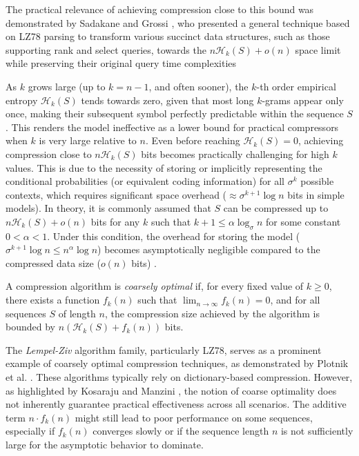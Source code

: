 The practical relevance of achieving compression close to this bound was demonstrated by Sadakane and Grossi \cite{sadakane2006squeezing}, who presented a general technique based on LZ78 parsing to transform various succinct data structures, such as those supporting rank and select queries, towards the $n \mathcal{H}_k(S) + o(n)$ space limit while preserving their original query time complexities

\begin{remark}
    As $k$ grows large (up to $k=n-1$, and often sooner), the $k$-th order empirical entropy $\mathcal{H}_k(S)$ tends towards zero, given that most long $k$-grams appear only once, making their subsequent symbol perfectly predictable within the sequence $S$. This renders the model ineffective as a lower bound for practical compressors when $k$ is very large relative to $n$. Even before reaching $\mathcal{H}_k(S)=0$, achieving compression close to $n\mathcal{H}_k(S)$ bits becomes practically challenging for high $k$ values. This is due to the necessity of storing or implicitly representing the conditional probabilities (or equivalent coding information) for all $\sigma^k$ possible contexts, which requires significant space overhead ($\approx \sigma^{k+1} \log n$ bits in simple models). In theory, it is commonly assumed that $S$ can be compressed up to $n \mathcal{H}_k(S) + o(n)$ bits for any $k$ such that $k+1 \leq \alpha \log_\sigma n$ for some constant $0 < \alpha < 1$. Under this condition, the overhead for storing the model ($\sigma^{k+1} \log n \leq n^\alpha \log n$) becomes asymptotically negligible compared to the compressed data size ($o(n)$ bits) \cite{navarro2016compact}.
\end{remark}

\begin{definition} \label{def:coarsely_optimal_compression_algorithm}
    A compression algorithm is \emph{coarsely optimal} if, for every fixed value of $k \ge 0$, there exists a function $f_k(n)$ such that $\lim_{n\to\infty} f_k(n) = 0$, and for all sequences $S$ of length $n$, the compression size achieved by the algorithm is bounded by $n (\mathcal{H}_k(S) + f_k(n))$ bits.
\end{definition}

\noindent The \emph{Lempel-Ziv} algorithm family, particularly LZ78, serves as a prominent example of coarsely optimal compression techniques, as demonstrated by Plotnik et al. \cite{plotnik1992upper}. These algorithms typically rely on dictionary-based compression. However, as highlighted by Kosaraju and Manzini \cite{kosaraju2000compression}, the notion of coarse optimality does not inherently guarantee practical effectiveness across all scenarios. The additive term $n \cdot f_k(n)$ might still lead to poor performance on some sequences, especially if $f_k(n)$ converges slowly or if the sequence length $n$ is not sufficiently large for the asymptotic behavior to dominate.


